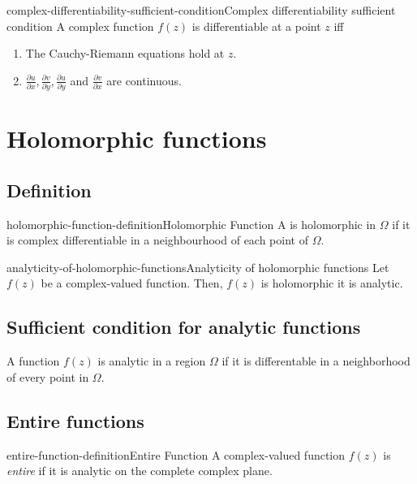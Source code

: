 \documentclass[preview]{standalone}
\begin{document}
\begin{snippettheorem}{complex-differentiability-sufficient-condition}{Complex differentiability sufficient condition}
    A complex function \(f(z)\) is differentiable at a point \(z\)
    iff
    \begin{enumerate}
        \item The Cauchy-Riemann equations hold at \(z\).
        \item \(\frac{\partial u}{\partial x}, \frac{\partial v}{\partial y},
        \frac{\partial u}{\partial y}\) and \(\frac{\partial v}{\partial x}\)
        are continuous.
    \end{enumerate}
\end{snippettheorem}

\section{Holomorphic functions}

\subsection{Definition}

\begin{snippetdefinition}{holomorphic-function-definition}{Holomorphic Function}
    A \function is holomorphic in \(\Omega\) if it is complex differentiable
    in a neighbourhood of each point of \(\Omega\).
\end{snippetdefinition}

\begin{snippettheorem}{analyticity-of-holomorphic-functions}{Analyticity of holomorphic functions}
    Let \(f(z)\) be a complex-valued function.
    Then, \(f(z)\) is holomorphic \ifandonlyif it is analytic.
\end{snippettheorem}


\subsection{Sufficient condition for analytic functions}

A function \(f(z)\) is analytic in a region \(\Omega\) if it is differentable
in a neighborhood of every point in \(\Omega\).

\subsection{Entire functions}

\begin{snippetdefinition}{entire-function-definition}{Entire Function}
    A complex-valued function \(f(z)\) is \textit{entire} if it is analytic on the complete complex plane.
\end{snippetdefinition}
\end{document}
